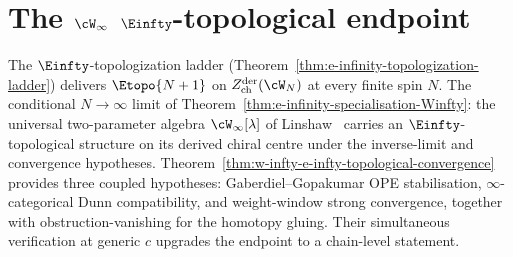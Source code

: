 %
%

\section{The \texorpdfstring{$\cW_\infty$}{W-infinity} \texorpdfstring{$\Einfty$}{E-infinity}-topological endpoint}
\label{sec:w-infty-e-infty-endpoint}

The $\Einfty$-topologization ladder
(Theorem~\ref{thm:e-infinity-topologization-ladder}) delivers
$\Etopo{N+1}$ on $Z^{\mathrm{der}}_{\mathrm{ch}}(\cW_N)$ at every
finite spin $N$. The conditional $N \to \infty$ limit of
Theorem~\ref{thm:e-infinity-specialisation-Winfty}: the universal
two-parameter algebra $\cW_\infty[\lambda]$ of
Linshaw~\cite{Linshaw-Winfty-universal} carries an
$\Einfty$-topological structure on its derived chiral centre under
the inverse-limit and convergence hypotheses.
Theorem~\ref{thm:w-infty-e-infty-topological-convergence} provides
three coupled hypotheses: Gaberdiel--Gopakumar OPE stabilisation,
$\infty$-categorical Dunn compatibility, and weight-window strong
convergence, together with obstruction-vanishing for the homotopy
gluing. Their simultaneous verification at generic $c$ upgrades the
endpoint to a chain-level statement.

